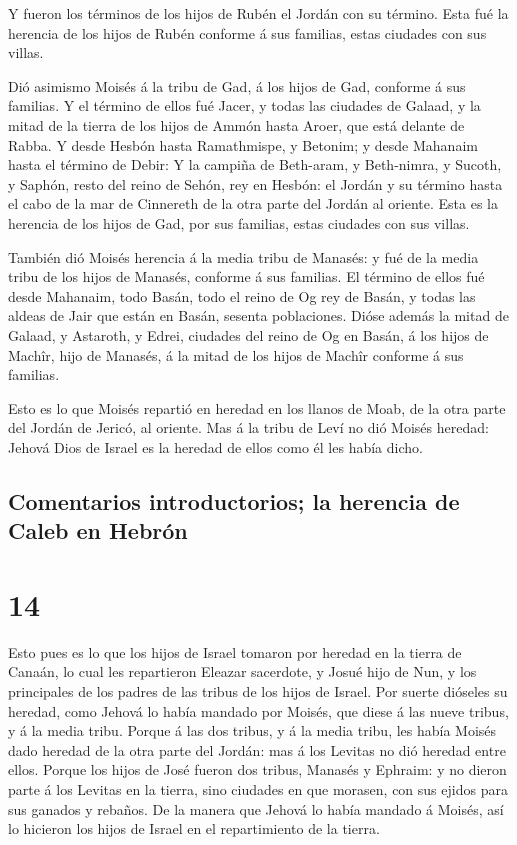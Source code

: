  Y fueron los términos de los hijos de Rubén el Jordán con
su término. Esta fué la herencia de los hijos de Rubén conforme á sus
familias, estas ciudades con sus villas.

 Dió asimismo Moisés á la tribu de Gad, á los hijos de Gad,
conforme á sus familias.  Y el término de ellos fué Jacer,
y todas las ciudades de Galaad, y la mitad de la tierra de los hijos de
Ammón hasta Aroer, que está delante de Rabba.  Y desde
Hesbón hasta Ramathmispe, y Betonim; y desde Mahanaim hasta el término
de Debir:  Y la campiña de Beth-aram, y Beth-nimra, y
Sucoth, y Saphón, resto del reino de Sehón, rey en Hesbón: el Jordán y
su término hasta el cabo de la mar de Cinnereth de la otra parte del
Jordán al oriente.  Esta es la herencia de los hijos de
Gad, por sus familias, estas ciudades con sus villas.

 También dió Moisés herencia á la media tribu de Manasés: y
fué de la media tribu de los hijos de Manasés, conforme á sus familias.
 El término de ellos fué desde Mahanaim, todo Basán, todo
el reino de Og rey de Basán, y todas las aldeas de Jair que están en
Basán, sesenta poblaciones.  Dióse además la mitad de
Galaad, y Astaroth, y Edrei, ciudades del reino de Og en Basán, á los
hijos de Machîr, hijo de Manasés, á la mitad de los hijos de Machîr
conforme á sus familias.

 Esto es lo que Moisés repartió en heredad en los llanos de
Moab, de la otra parte del Jordán de Jericó, al oriente. 
Mas á la tribu de Leví no dió Moisés heredad: Jehová Dios de Israel es
la heredad de ellos como él les había dicho.

\hypertarget{comentarios-introductorios-la-herencia-de-caleb-en-hebruxf3n}{%
\subsection{Comentarios introductorios; la herencia de Caleb en
Hebrón}\label{comentarios-introductorios-la-herencia-de-caleb-en-hebruxf3n}}

\hypertarget{section-13}{%
\section{14}\label{section-13}}

 Esto pues es lo que los hijos de Israel tomaron por heredad
en la tierra de Canaán, lo cual les repartieron Eleazar sacerdote, y
Josué hijo de Nun, y los principales de los padres de las tribus de los
hijos de Israel.  Por suerte dióseles su heredad, como
Jehová lo había mandado por Moisés, que diese á las nueve tribus, y á la
media tribu.  Porque á las dos tribus, y á la media tribu,
les había Moisés dado heredad de la otra parte del Jordán: mas á los
Levitas no dió heredad entre ellos.  Porque los hijos de
José fueron dos tribus, Manasés y Ephraim: y no dieron parte á los
Levitas en la tierra, sino ciudades en que morasen, con sus ejidos para
sus ganados y rebaños.  De la manera que Jehová lo había
mandado á Moisés, así lo hicieron los hijos de Israel en el
repartimiento de la tierra.

